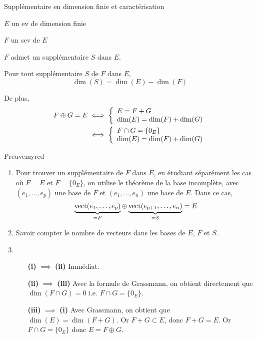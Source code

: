     \begin{theo}{Supplémentaire en dimension finie et caractérisation}{}
        \begin{soient}
            \item $E$ un ev de dimension finie
            \item $F$ un sev de $E$
        \end{soient}
        \begin{alors}
            \item $F$ admet un supplémentaire $S$ dans $E$.
            \item Pour tout supplémentaire $S$ de $F$ dans $E$,
            \[ \dim(S) = \dim(E) - \dim(F) \]
            \item De plus, \begin{align*}
                F \oplus G = E & \iff \et{E = F+G}{\dim(E) = \dim(F) + \dim(G)}\\
                & \iff \et{F \cap G = \left\{ 0_E \right\}}{\dim(E) = \dim(F) + \dim(G)}
            \end{align*}
        \end{alors}
    \end{theo}
    
    \begin{demo}{Preuve}{myred}
        \begin{enumerate}
            \item Pour trouver un supplémentaire de $F$ dans $E$, en étudiant séparément les cas où $F= E$ et $F = \big\{ 0_E \big\}$, on utilise le théorème de la base incomplète, avec $(e_1,\ldots,e_p)$ une base de $F$ et $(e_1,\ldots,e_n)$ une base de $E$. Dans ce cas, \[ \underbrace{\operatorname{vect}(e_1,\ldots,e_p)}_{= F} \oplus \underbrace{\operatorname{vect}(e_{p+1},\ldots,e_n)}_{= S} = E \]
            \item Savoir compter le nombre de vecteurs dans les bases de $E$, $F$ et $S$.
            \item \begin{itemize}[leftmargin=3cm]
            \item[\textbf{(i)} $\implies$ \textbf{(ii)}] Immédiat.
            \item[\textbf{(ii)} $\implies$ \textbf{(iii)}] Avec la formule de Grassmann, on obtient directement que $\dim(F \cap G) = 0$ i.e. $F \cap G = \{ 0_E \}$.
            \item[\textbf{(iii)} $\implies$ \textbf{(i)}] Avec Grassmann, on obtient que $\dim(E) = \dim(F+G)$. Or $F + G \subset E$, donc $F + G = E$. Or $ F \cap G = \big\{ 0_E \big\}$ donc $E = F \oplus G$.
        \end{itemize}
        \end{enumerate}
    \end{demo}

